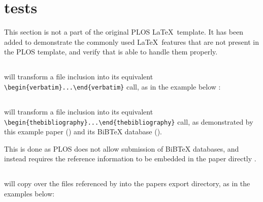 \section*{ tests}

This section is not a part of the original PLOS \LaTeX~template.
It has been added to demonstrate the commonly used \LaTeX~features that are not present in the PLOS template, and verify that  is able to handle them properly.

\subsection*{}

 will transform a \verb|| file inclusion into its equivalent \verb|\begin{verbatim}...\end{verbatim}| call, as in the example below \cite{Project:friendly_name_mixin:CodeRepository}:



\subsection*{}

 will transform a \verb|| file inclusion into its equivalent \verb|\begin{thebibliography}...\end{thebibliography}| call, as demonstrated by this example paper () and its BiBTeX database ().

This is done as PLOS does not allow submission of BiBTeX databases, and instead requires the reference information to be embedded in the paper directly \cite{PLOS:LaTeX}.

\subsection*{}

 will copy over the files referenced by \verb|| into the papers export directory, as in the examples below:




